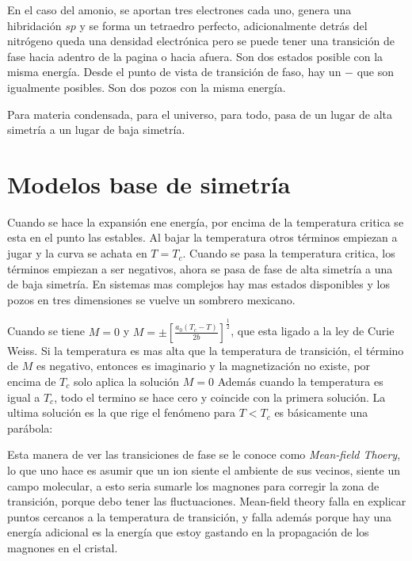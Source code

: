 \documentclass[11pt,fleqn]{book}
\begin{document}

En el caso del amonio, se aportan tres electrones cada uno, genera una hibridación $sp$ y se forma un tetraedro perfecto, adicionalmente detrás del nitrógeno queda una densidad electrónica pero se puede tener una transición de fase hacia adentro de la pagina o hacia afuera. Son dos estados posible con la misma energía. Desde el punto de vista de transición de faso, hay un $-$ que son igualmente posibles. Son dos pozos con la misma energía. 

Para materia condensada, para el universo, para todo, pasa de un lugar de alta simetría a un lugar de baja simetría.
    
    
    \section{Modelos base de simetría}


Cuando se hace la expansión ene energía, por encima de la temperatura critica se esta en el punto las estables. Al bajar la temperatura otros términos empiezan a jugar y la curva se achata en $T=T_{c}$. Cuando se pasa la temperatura critica, los términos empiezan a ser negativos, ahora se pasa de fase de alta simetría a una de baja simetría. En sistemas mas complejos hay mas estados disponibles y los pozos en tres dimensiones se vuelve un sombrero mexicano.


Cuando se tiene $M=0$ y $M=\pm\left[\frac{a_{0}(T_{c}-T)}{2b}\right]^{\frac{1}{2}}$, que esta ligado a la ley de Curie Weiss. Si la temperatura es mas alta que la temperatura de transición, el término de $M$ es negativo, entonces es imaginario y la magnetización no existe, por encima de $T_{c}$ solo aplica la solución $M=0$ Además cuando la temperatura es igual a $T_{c}$, todo el termino se hace cero y coincide con la primera solución. La ultima solución es la que rige el fenómeno para $T<T_{c}$ es básicamente una parábola:


Esta manera de ver las transiciones de fase se le conoce como \emph{Mean-field Thoery}, lo que uno hace es asumir que un ion siente el ambiente de sus vecinos, siente un campo molecular, a esto seria sumarle los magnones para corregir la zona de transición, porque debo tener las fluctuaciones. Mean-field theory falla en explicar puntos cercanos a la temperatura de transición, y falla además porque hay una energía adicional  es la energía que estoy gastando en la propagación de los magnones en el cristal.   
\end{document}

